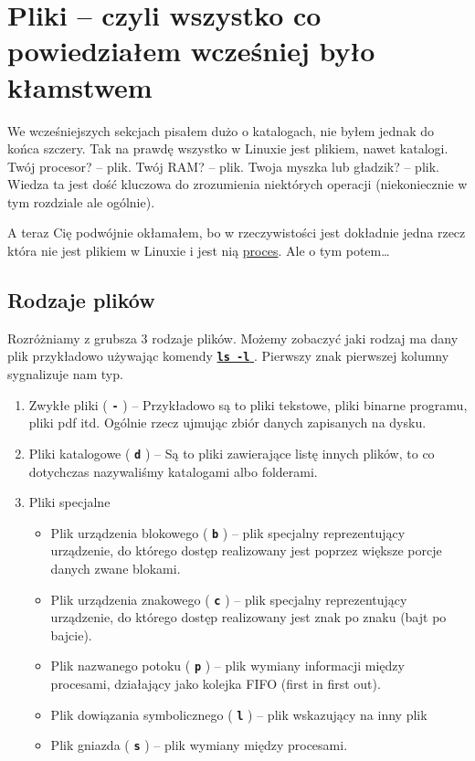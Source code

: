 \documentclass[11pt, a4paper]{article}
\newcommand{\ttbf}[1]{
    \texttt{\textbf{#1}}
}
\begin{document}
\section{Pliki -- czyli wszystko co powiedziałem wcześniej było kłamstwem}
\label{sec:files}

We wcześniejszych sekcjach pisałem dużo o katalogach, nie byłem jednak do końca szczery. Tak na prawdę wszystko w Linuxie jest plikiem, nawet katalogi. Twój procesor? -- plik. Twój RAM? -- plik. Twoja myszka lub gładzik? -- plik. Wiedza ta jest dość kluczowa do zrozumienia niektórych operacji (niekoniecznie w tym rozdziale ale ogólnie).

A teraz Cię podwójnie okłamałem, bo w rzeczywistości jest dokładnie jedna rzecz która nie jest plikiem w Linuxie i jest nią \hyperref[sec:process]{proces}. Ale o tym potem\dots

\subsection{Rodzaje plików}

Rozróżniamy z grubsza 3 rodzaje plików. Możemy zobaczyć jaki rodzaj ma dany plik przykładowo używając komendy \hyperref[sec:ls]{\ttbf{ls -l}}. Pierwszy znak pierwszej kolumny sygnalizuje nam typ.

\begin{enumerate}
    \item Zwykłe pliki (\ttbf{-}) -- Przykładowo są to pliki tekstowe, pliki binarne programu, pliki pdf itd. Ogólnie rzecz ujmując zbiór danych zapisanych na dysku.
    \item Pliki katalogowe (\ttbf{d}) -- Są to pliki zawierające listę innych plików, to co dotychczas nazywaliśmy katalogami albo folderami.
    \item Pliki specjalne
    \begin{itemize}
        \item Plik urządzenia blokowego (\ttbf{b}) -- plik specjalny reprezentujący urządzenie, do którego dostęp realizowany jest poprzez większe porcje danych zwane blokami.
        \item Plik urządzenia znakowego (\ttbf{c}) -- plik specjalny reprezentujący urządzenie, do którego dostęp realizowany jest znak po znaku (bajt po bajcie).
        \item Plik nazwanego potoku (\ttbf{p}) -- plik wymiany informacji między procesami, działający jako kolejka FIFO (first in first out).
        \item Plik dowiązania symbolicznego (\ttbf{l}) -- plik wskazujący na inny plik
        \item Plik gniazda (\ttbf{s}) -- plik wymiany między procesami.
    \end{itemize}
\end{enumerate}
\end{document}
